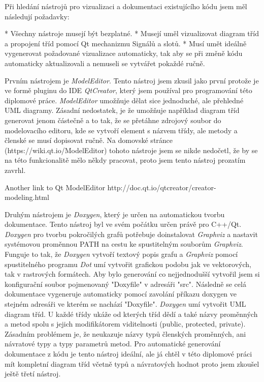 
Při hledání nástrojů pro vizualizaci a dokumentaci existujícího kódu jsem měl následují požadavky:

* Všechny nástroje musejí být bezplatné.
* Musejí uměl vizualizovat diagram tříd a propojení tříd pomocí Qt mechanizmu Signálů a slotů.
* Musí umět ideálně vygenerovat požadované vizualizace automaticky, tak aby se při změně kódu automaticky aktualizovali a nemuseli se vytvářet pokaždé ručně.


Prvním nástrojem je \textit{ModelEditor}. Tento nástroj jsem zkusil jako první protože je ve formě pluginu do IDE \textit{QtCreator}, který jsem používal pro programování této diplomové práce. \textit{ModelEditor} umožňuje dělat sice jednoduché, ale přehledné UML diagramy. Zásadní nedostatek, je že umožňuje například diagram tříd generovat jenom částečně a to tak, že se přetáhne zdrojový soubor do modelovacího editoru, kde se vytvoří element s názvem třídy, ale metody a členské se musí dopisovat ručně. Na domovské stránce (https://wiki.qt.io/ModelEditor) tohoto nástroje jsem se nikde nedočetl, že by se na této funkcionalitě mělo někdy pracovat, proto jsem tento nástroj prozatím zavrhl.

Another link to Qt ModelEditor http://doc.qt.io/qtcreator/creator-modeling.html


Druhým nástrojem je \textit{Doxygen}, který je určen na automatickou tvorbu dokumentace. Tento nástroj byl ve svém počátku určen právě pro C++/Qt. \textit{Doxygen} pro tvorbu pokročilých grafů potřebuje doinstalovat \textit{Graphviz} a nastavit systémovou proměnnou PATH na cestu ke spustitelným souborům \textit{Graphviz}. Funguje to tak, že \textit{Doxygen} vytvoří textový popis grafu a \textit{Graphviz} pomocí spustitelného programu \textit{Dot} umí vytvořit grafickou podobu jak ve vektorových, tak v rastrových formátech. Aby bylo generování co nejjednodušší vytvořil jsem si konfigurační soubor pojmenovaný "Doxyfile" v adresáři "src". Následně se celá dokumentace vygeneruje automaticky pomocí zavolání příkazu doxygen ve stejném adresáři ve kterém se nachází "Doxyfile". \textit{Doxygen} umí vytvořit UML diagram tříd. U každé třídy ukáže od kterých tříd dědí a také názvy proměnných a metod spolu s jejich modifikátorem viditelnosti (public, protected, private). Zásadním problémem je, že neukazuje názvy typů členských proměnných, ani návratové typy a typy parametrů metod. 
Pro automatické generování dokumentace z kódu je tento nástroj ideální, ale já chtěl v této diplomové práci mít kompletní diagram tříd včetně typů a návratových hodnot proto jsem zkoušel ještě třetí nástroj.

